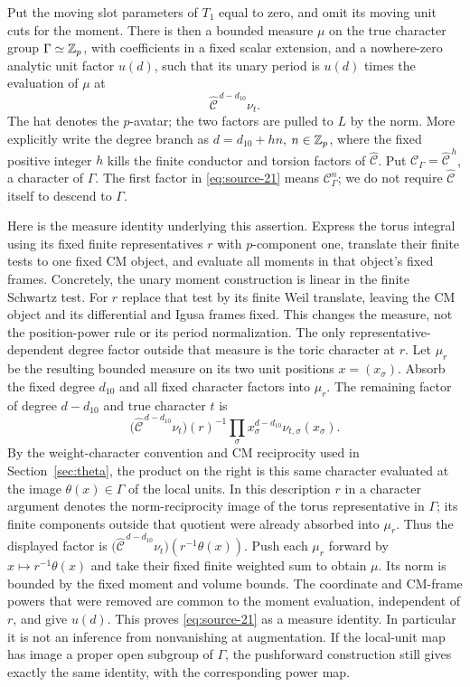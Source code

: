 Put the moving slot parameters of $T_1$ equal to zero, and omit
its moving unit cuts for the moment.  There is then a bounded
measure $\mu$ on the true character group $\Gamma\simeq\mathbb Z_p$,
with coefficients in a fixed scalar extension, and a nowhere-zero
analytic unit factor $u(d)$, such that its unary period is
$u(d)$ times the evaluation of $\mu$ at
\begin{equation}
                 \widehat{\mathcal C}^{\,d-d_{10}}\nu_t.
\tag{21}\label{eq:source-21}
\end{equation}
The hat denotes the $p$-avatar; the two factors are pulled to $L$
by the norm.  More explicitly write the degree branch as
$d=d_{10}+hn$, $n\in\mathbb Z_p$, where the fixed positive integer $h$
kills the finite conductor and torsion factors of
$\widehat{\mathcal C}$.  Put
$\mathcal C_\Gamma=\widehat{\mathcal C}^{\,h}$, a character of $\Gamma$.
The first factor in \eqref{eq:source-21} means $\mathcal C_\Gamma^n$;
we do not require $\widehat{\mathcal C}$ itself to descend to
$\Gamma$.

Here is the measure identity underlying this assertion.  Express
the torus integral using its fixed finite representatives $r$ with
$p$-component one, translate their finite tests to one fixed CM
object, and evaluate all moments in that object's fixed frames.
Concretely, the unary moment construction is linear in the finite
Schwartz test.  For $r$ replace that test by its finite Weil translate,
leaving the CM object and its differential and Igusa frames fixed.
This changes the measure, not the position-power rule or its period
normalization.  The only representative-dependent degree factor
outside that measure is the toric character at $r$.
Let $\mu_r$ be the resulting bounded measure on its two unit
positions $x=(x_\sigma)$.  Absorb the fixed degree $d_{10}$ and all
fixed character factors into $\mu_r$.  The remaining factor of
degree $d-d_{10}$ and true character $t$ is
\[
 \bigl(\widehat{\mathcal C}^{\,d-d_{10}}\nu_t\bigr)(r)^{-1}
 \prod_\sigma x_\sigma^{d-d_{10}}
                   \nu_{t,\sigma}(x_\sigma).
\]
By the weight-character convention and CM reciprocity used in
Section~\ref{sec:theta}, the product on the right is this same
character evaluated at the image $\theta(x)\in\Gamma$ of the
local units.  In this description $r$ in a character argument
denotes the norm-reciprocity image of the torus representative in
$\Gamma$; its finite components outside that quotient were already
absorbed into $\mu_r$.  Thus the displayed factor is
$\bigl(\widehat{\mathcal C}^{\,d-d_{10}}\nu_t\bigr)
(r^{-1}\theta(x))$.  Push each $\mu_r$ forward by
$x\mapsto r^{-1}\theta(x)$ and take their fixed finite weighted
sum to obtain $\mu$.  Its norm is bounded by the fixed moment and
volume bounds.  The coordinate and CM-frame powers that were
removed are common to the moment evaluation, independent of $r$,
and give $u(d)$.  This proves \eqref{eq:source-21} as a measure
identity.  In particular it is not an inference from nonvanishing
at augmentation.  If the local-unit map has image a proper open
subgroup of $\Gamma$, the pushforward construction still gives
exactly the same identity, with the corresponding power map.

